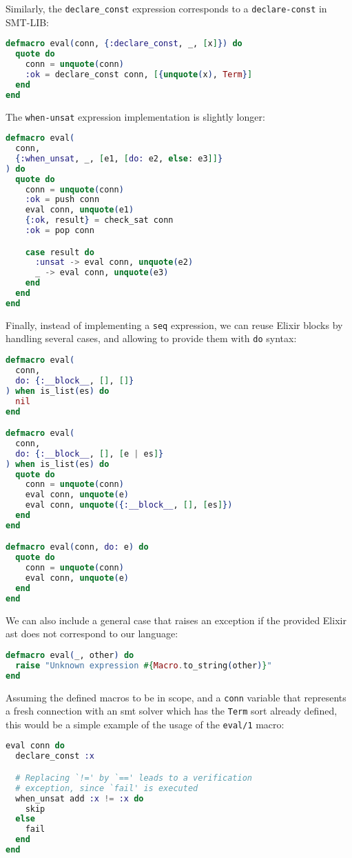 Similarly, the \verb|declare_const| expression corresponds to a
\verb|declare-const| in SMT-LIB:

\begin{lstlisting}[language=elixir,numbers=none,frame=none]
defmacro eval(conn, {:declare_const, _, [x]}) do
  quote do
    conn = unquote(conn)
    :ok = declare_const conn, [{unquote(x), Term}]
  end
end
\end{lstlisting}

The \verb|when-unsat| expression implementation is slightly longer:

\begin{lstlisting}[language=elixir,numbers=none,frame=none]
defmacro eval(
  conn, 
  {:when_unsat, _, [e1, [do: e2, else: e3]]}
) do
  quote do
    conn = unquote(conn)
    :ok = push conn
    eval conn, unquote(e1)
    {:ok, result} = check_sat conn
    :ok = pop conn

    case result do
      :unsat -> eval conn, unquote(e2)
      _ -> eval conn, unquote(e3)
    end
  end
end
\end{lstlisting}

Finally, instead of implementing a \verb|seq| expression, we can reuse Elixir
blocks by handling several cases, and allowing to provide them with \verb|do|
syntax:

\begin{lstlisting}[language=elixir,numbers=none,frame=none]
defmacro eval(
  conn, 
  do: {:__block__, [], []}
) when is_list(es) do
  nil
end

defmacro eval(
  conn, 
  do: {:__block__, [], [e | es]}
) when is_list(es) do
  quote do
    conn = unquote(conn)
    eval conn, unquote(e)
    eval conn, unquote({:__block__, [], [es]})
  end
end

defmacro eval(conn, do: e) do
  quote do
    conn = unquote(conn)
    eval conn, unquote(e)
  end
end
\end{lstlisting}

We can also include a general case that raises an exception if the provided
Elixir \gls{ast} does not correspond to our language:

\begin{lstlisting}[language=elixir,numbers=none,frame=none]
defmacro eval(_, other) do
  raise "Unknown expression #{Macro.to_string(other)}"
end
\end{lstlisting}

Assuming the defined macros to be in scope, and a \verb|conn| variable that
represents a fresh connection with an \acrshort{smt} solver which has the
\verb|Term| sort already defined, this would be a simple example of the usage of
the \verb|eval/1| macro:

\begin{lstlisting}[language=elixir,numbers=none,frame=none]
eval conn do
  declare_const :x

  # Replacing `!=' by `==' leads to a verification
  # exception, since `fail' is executed
  when_unsat add :x != :x do
    skip
  else
    fail
  end
end
\end{lstlisting}
